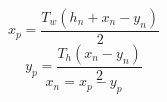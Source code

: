 \documentclass[a4paper]{article}
\begin{document}
$$ x_p = \frac{T_w(h_n+x_n-y_n)}{2} $$
$$ y_p = \frac{T_h(x_n-y_n)}{2} $$
$$ x_n = x_p - y_p $$
\end{document}

